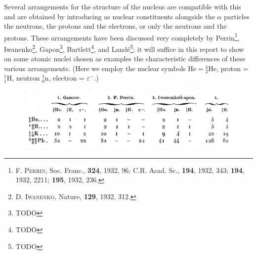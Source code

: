 \documentclass[a4paper,11pt]{article}
\newcommand{\?}[2]{#1\footnote{\textsc{Translator note}: #2}}
\newcommand{\citeauthor}[1]{\textsc{#1}}
\newcommand{\citepub}[1]{#1}
\newcommand{\citevol}[1]{\textbf{#1}}
\newcommand{\citepage}[1]{#1}
\newcommand{\citeyear}[1]{#1}
\newcommand{\El}[1]{\text{#1}}
\newcommand{\mnEl}[3]{{}^{#1}_{#2}{\El{#3}}}
\begin{document}
Several arrangements for the structure of the nucleus are compatible with this and are obtained by introducing as nuclear constituents alongside the $\alpha$ particles the neutrons, the protons and the electrons, or only the neutrons and the protons. These arrangements have been discussed very completely by Perrin\footnote{\citeauthor{F. Perrin}, \citepub{Soc. Franc.}, \citevol{324}, \citeyear{1932}, \citepage{96}; \citepub{C.R. Acad. Sc.}, \citevol{194}, \citeyear{1932}, \citepage{343}; \citevol{194}, \citeyear{1932}, \citepage{2211}; \citevol{195}, \citeyear{1932}, \citepage{236}.}, Iwanenko\footnote{\citeauthor{D. Iwanenko}, \citepub{Nature}, \citevol{129}, \citeyear{1932}, \citepage{312}.}, Gapon\footnote{TODO}, Bartlett\footnote{TODO}, and Land\'e\footnote{TODO}; it will suffice in this report to show on some atomic nuclei chosen as examples the characteristic differences of these various arrangements. (Here we employ the nuclear symbols $\El{He} = \mnEl{4}{2}{He}$, proton = $\mnEl{1}{1}{H}$, neutron $\mnEl{1}{0}{n}$, electron = $\varepsilon^-$.)

\begin{figure}[h!]
\centering
\includegraphics[width=350pt]{images/table1}
\end{figure}
\end{document}
